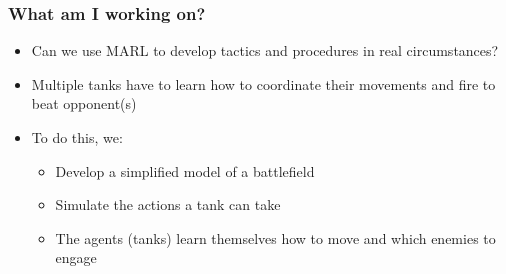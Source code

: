 \documentclass{beamer}
\begin{document}
\begin{frame}
\frametitle{What am I working on?}
\begin{itemize}
    \item Can we use MARL to develop tactics and procedures in real circumstances?
    \item Multiple tanks have to learn how to coordinate their movements and fire to beat opponent(s)
    \item To do this, we:
        \begin{itemize}
            \item Develop a simplified model of a battlefield
            \item Simulate the actions a tank can take
            \item The agents (tanks) learn themselves how to move and which enemies to engage
        \end{itemize}
\end{itemize}
\end{frame}
\end{document}
